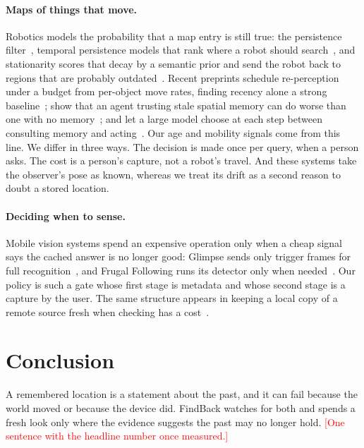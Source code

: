 \documentclass[sigconf,10pt]{acmart}
\newcommand{\todo}[1]{\textcolor{red}{[#1]}}
\newcommand{\sys}{FindBack}
\begin{document}
\paragraph{Maps of things that move.}
Robotics models the probability that a map entry is still true: the persistence
filter~\cite{rosen2016towards}, temporal persistence models that rank where a robot should
search~\cite{toris2017temporal}, and stationarity scores that decay by a semantic prior and send
the robot back to regions that are probably outdated~\cite{bogenberger2026glasses}.
Recent preprints schedule re-perception under a budget from per-object move rates, finding recency
alone a strong baseline~\cite{ghosh2026memory}; show that an agent trusting stale spatial memory
can do worse than one with no memory~\cite{sun2026memory}; and let a large model choose at each
step between consulting memory and acting~\cite{chen2025searching}.
Our age and mobility signals come from this line.
We differ in three ways.
The decision is made once per query, when a person asks.
The cost is a person's capture, not a robot's travel.
And these systems take the observer's pose as known, whereas we treat its drift as a second reason
to doubt a stored location.

\paragraph{Deciding when to sense.}
Mobile vision systems spend an expensive operation only when a cheap signal says the cached answer
is no longer good: Glimpse sends only trigger frames for full
recognition~\cite{chen2015glimpse}, and Frugal Following runs its detector only when
needed~\cite{apicharttrisorn2019frugal}.
Our policy is such a gate whose first stage is metadata and whose second stage is a capture by the
user.
The same structure appears in keeping a local copy of a remote source fresh when checking has a
cost~\cite{cho2000synchronizing}.

\section{Conclusion}

A remembered location is a statement about the past, and it can fail because the world moved or
because the device did.
\sys{} watches for both and spends a fresh look only where the evidence suggests the past may no
longer hold.
\todo{One sentence with the headline number once measured.}



\end{document}
